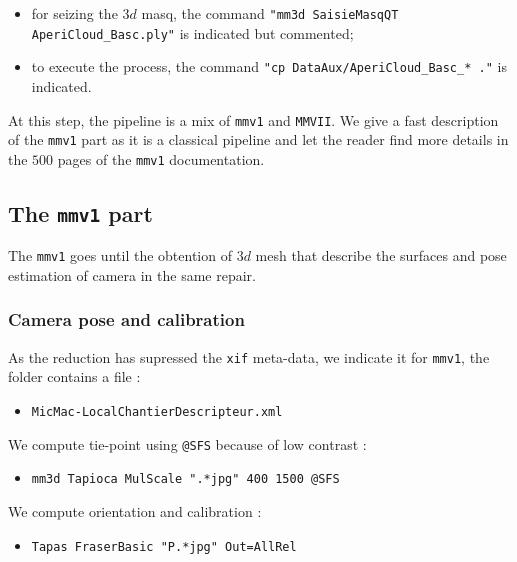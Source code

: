 \begin{itemize}
    \item for seizing the $3d$ masq, the command {\tt"mm3d SaisieMasqQT AperiCloud\_Basc.ply"}
	    is indicated but commented;
    \item to execute the process, the command {\tt "cp DataAux/AperiCloud\_Basc\_* ."} is indicated.
\end{itemize}

At this step, the pipeline is a mix of {\tt mmv1} and {\tt MMVII}. We give a fast description
of the {\tt mmv1} part as it is a classical pipeline and let the reader find more details
in the $500$ pages of the  {\tt mmv1} documentation.



\subsection{The  {\tt mmv1} part}

The  {\tt mmv1} goes until the obtention of $3d$ mesh that describe the surfaces and
pose estimation of camera in the same repair.


\subsubsection{Camera pose and calibration}

As the reduction has supressed the {\tt xif} meta-data, we indicate it
for {\tt mmv1}, the folder contains a file :

\begin{itemize}
    \item {\tt MicMac-LocalChantierDescripteur.xml}
\end{itemize}

We compute tie-point using {\tt @SFS} because of low contrast :

\begin{itemize}
    \item {\tt mm3d Tapioca MulScale ".*jpg" 400 1500 @SFS}
\end{itemize}

We compute orientation and calibration : 

\begin{itemize}
   \item {\tt Tapas FraserBasic "P.*jpg" Out=AllRel}
\end{itemize}

